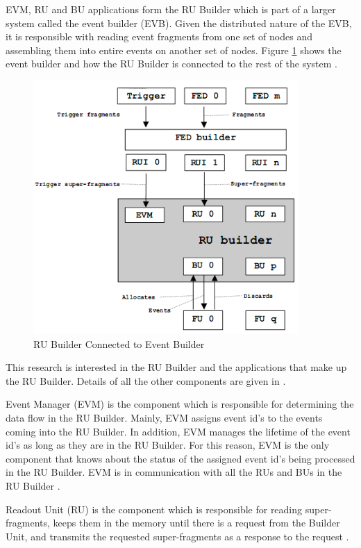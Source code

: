 EVM, RU and BU applications form the RU Builder which is part of a larger system called the event builder (EVB). Given the distributed nature of the EVB, it is responsible with reading event fragments from one set of nodes and assembling them into entire events on another set of nodes. Figure \ref{fig:evbsystem} shows the event builder and how the RU Builder is connected to the rest of the system \cite{rubuilder}. 

\begin{figure}
	\centering
		\includegraphics[width=0.90\textwidth]{figures/evbsystem.png}
	\caption{RU Builder Connected to Event Builder}
	\label{fig:evbsystem}
\end{figure}

This research is interested in the RU Builder and the applications that make up the RU Builder. Details of all the other components are given in \cite{CMSTDR}.

Event Manager (EVM) is the component which is responsible for determining the data flow in the RU Builder. Mainly, EVM assigns event id's to the events coming into the RU Builder. In addition, EVM manages the lifetime of the event id's as long as they are in the RU Builder. For this reason, EVM is the only component that knows about the status of the assigned event id's being processed in the RU Builder. EVM is in communication with all the RUs and BUs in the RU Builder \cite{CMSTDR}.

Readout Unit (RU) is the component which is responsible for reading super-fragments, keeps them in the memory until there is a request from the Builder Unit, and transmits the requested super-fragments as a response to the request \cite{CMSTDR}. 

